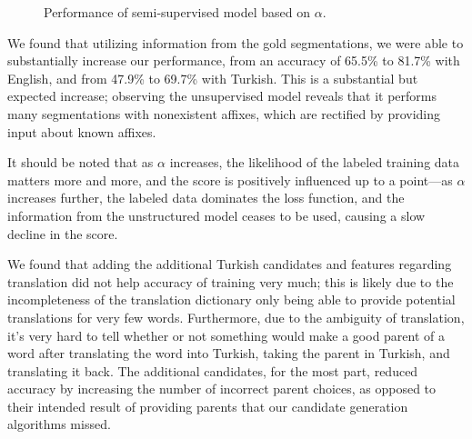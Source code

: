 \documentclass[11pt,twocolumn]{article}
\begin{document}
\begin{figure}
    \label{fig:supervised}
    \caption{Performance of semi-supervised model based on $\alpha$.}
\end{figure}

We found that utilizing information from the gold segmentations, we were able to substantially increase our
performance, from an accuracy of 65.5\% to 81.7\% with English, and from 47.9\% to 69.7\% with Turkish.
This is a substantial but expected increase; observing the unsupervised model reveals that it performs
many segmentations with nonexistent affixes, which are rectified by providing input about known affixes.

It should be noted that as $\alpha$ increases, the likelihood of the labeled training data matters more and more,
and the score is positively influenced up to a point---as $\alpha$ increases further, the labeled data
dominates the loss function, and the information from the unstructured model ceases to be used,
causing a slow decline in the score.

We found that adding the additional Turkish candidates and features regarding translation
did not help accuracy of training very much; this is likely due to the incompleteness of the translation
dictionary only being able to provide potential translations for very few words. Furthermore, due to the ambiguity
of translation, it's very hard to tell whether or not something would make a good parent of a word after
translating the word into Turkish, taking the parent in Turkish, and translating it back. The additional candidates,
for the most part, reduced accuracy by increasing the number of incorrect parent choices,
as opposed to their intended result of providing parents that our candidate generation algorithms missed.


\end{document}
